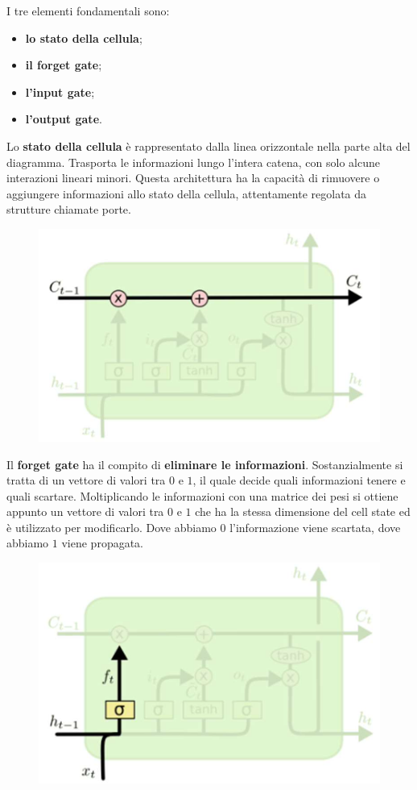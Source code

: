 I tre elementi fondamentali sono:
\begin{itemize}
   \item \textbf{lo stato della cellula};
   \item \textbf{il forget gate};
   \item \textbf{l'input gate};
   \item \textbf{l'output gate}.
\end{itemize}
Lo \textbf{stato della cellula} è rappresentato dalla linea orizzontale nella parte alta del diagramma.
Trasporta le informazioni lungo l'intera catena, con solo alcune interazioni lineari minori. Questa 
architettura ha la capacità di rimuovere o aggiungere informazioni allo stato 
della cellula, attentamente regolata da strutture chiamate porte.
\begin{figure}[!h]
   \includegraphics[scale=.5]{images/rnn/cell_state.png}
   \centering
\end{figure}
\newpage
Il \textbf{forget gate} ha il compito di \textbf{eliminare le informazioni}. Sostanzialmente si tratta
di un vettore di valori tra $0$ e $1$, il quale decide quali informazioni tenere e quali
scartare. Moltiplicando le informazioni con una matrice dei pesi si ottiene appunto
un vettore di valori tra $0$ e $1$ che ha la stessa dimensione del cell state ed è
utilizzato per modificarlo. Dove abbiamo $0$ l'informazione viene scartata, 
dove abbiamo $1$ viene propagata.
\begin{figure}[!h]
   \includegraphics[scale=.5]{images/rnn/forget_gate.png}
   \centering
\end{figure}


